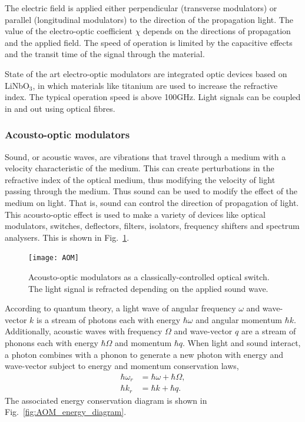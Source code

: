 The electric field is applied either perpendicular (transverse modulators) or parallel (longitudinal modulators) to the direction of the propagation light. The value of the electro-optic coefficient $\chi$ depends on the directions of propagation and the applied field. The speed of operation is limited by the capacitive effects and the transit time of the signal through the material. 

State of the art electro-optic modulators are integrated optic devices based on LiNbO$_3$, in which materials like titanium are used to increase the refractive index. The typical operation speed is above 100GHz. Light signals can be coupled in and out using optical fibres.

%
%

\subsubsection{Acousto-optic modulators} 

Sound, or acoustic waves, are vibrations that travel through a medium with a velocity characteristic of the medium. This can create perturbations in the refractive index of the optical medium, thus modifying the velocity of light passing through the medium. Thus sound can be used to modify the effect of the medium on light. That is, sound can control the direction of propagation of light. This acousto-optic effect is used to make a variety of devices like optical modulators, switches, deflectors, filters, isolators, frequency shifters and spectrum analysers. This is shown in Fig.~\ref{fig:AOM}.

\begin{figure}[!htbp]
\texttt{[image: AOM]}
\captionspacefig \caption{Acousto-optic modulators as a classically-controlled optical switch. The light signal is refracted depending on the applied sound wave.}\label{fig:AOM}
\end{figure}

According to quantum theory, a light wave of angular frequency $\omega$ and wave-vector $k$ is a stream of photons each with energy $\hbar\omega$ and angular momentum $\hbar k$. Additionally, acoustic waves with frequency $\Omega$ and wave-vector $q$ are a stream of phonons each with energy $\hbar\Omega$ and momentum $\hbar q$. When light and sound interact, a photon combines with a phonon to generate a new photon with energy and wave-vector subject to energy and momentum conservation laws, 
\begin{align}\label{eq:AOM_energy}
\hbar\omega_r &= \hbar\omega + \hbar\Omega,\nonumber\\
\hbar k_r &= \hbar k + \hbar q.
\end{align}
The associated energy conservation diagram is shown in Fig.~\ref{fig:AOM_energy_diagram}.

